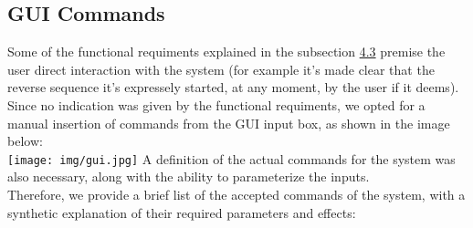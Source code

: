 \documentclass{llncs}
\begin{document}
\subsection{GUI Commands}
Some of the functional requiments explained in the subsection \hyperref[sec:Functional requiments]{4.3} premise the user direct interaction with the system (for example it's made clear that the reverse sequence it's expressely started, at any moment, by the user if it deems).\\
Since no indication was given by the functional requiments, we opted for a \\manual insertion of commands from the GUI input box, as shown in the image below:\\

\hspace{-1cm}
 \texttt{[image: img/gui.jpg]} 
A definition of the actual commands for the system was also necessary, along with the ability to parameterize the inputs.\\
Therefore, we provide a brief list of the accepted commands of the system, with a synthetic explanation of their required parameters and effects:
\end{document}
